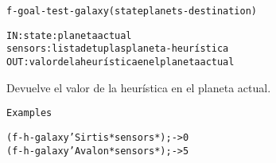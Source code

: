 \begin{aibox}{\function}
\begin{alltt}
f-goal-test-galaxy (state planets-destination) 


IN:     state: planeta actual
        sensors: lista de tuplas planeta-heurística
OUT: valor de la heurística en el planeta actual

\end{alltt}
\end{aibox}

\begin{aibox}{\examples}
\begin{alltt}

\end{alltt}
\end{aibox}

\begin{aibox}{\comments}
Devuelve el valor de la heurística en el planeta actual.


\end{aibox}

\begin{aibox}{\pseudocode}
\begin{alltt}
Examples

\end{alltt}
\end{aibox}

\begin{aibox}{\code}
\begin{alltt}
(f-h-galaxy 'Sirtis *sensors*) ;-> 0
(f-h-galaxy 'Avalon *sensors*) ;-> 5




\end{alltt}
\end{aibox}
